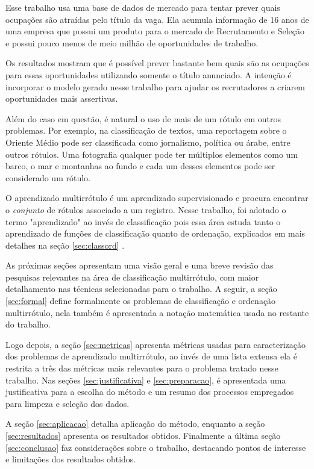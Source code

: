 \documentclass[runningheads,a4paper]{llncs}
\begin{document}
Esse trabalho usa uma base de dados de mercado para tentar prever quais ocupações são atraídas pelo título da vaga. Ela acumula informação de 16 anos de uma empresa que possui um produto para o mercado de Recrutamento e Seleção e possui pouco menos de meio milhão de oportunidades de trabalho.

Os resultados mostram que é possível prever bastante bem quais são as ocupações para essas oportunidades utilizando somente o título anunciado. A intenção é incorporar o modelo gerado nesse trabalho para ajudar os recrutadores a criarem oportunidades mais assertivas.

Além do caso em questão, é natural o uso de mais de um rótulo em outros problemas. Por exemplo, na classificação de textos, uma reportagem sobre o Oriente Médio pode ser classificada como jornalismo, política ou árabe, entre outros rótulos. Uma fotografia qualquer pode ter múltiplos elementos como um barco, o mar e montanhas ao fundo e cada um desses elementos pode ser considerado um rótulo.

O aprendizado multirrótulo é um aprendizado supervisionado e procura encontrar o \emph{conjunto} de rótulos associado a um registro. Nesse trabalho, foi adotado o termo "aprendizado" ao invés de classificação pois essa área estuda tanto o aprendizado de funções de classificação quanto de ordenação, explicados em mais detalhes na seção \ref{sec:classord} \cite{Zhang2014-be}.

As próximas seções apresentam uma visão geral e uma breve revisão das pesquisas relevantes na área de classificação multirrótulo, com maior detalhamento nas técnicas selecionadas para o trabalho. A seguir, a seção \ref{sec:formal} define formalmente os problemas de classificação e ordenação multirrótulo, nela também é apresentada a notação matemática usada no restante do trabalho. 

Logo depois, a seção \ref{sec:metricas} apresenta métricas usadas para caracterização dos problemas de aprendizado multirrótulo, ao invés de uma lista extensa ela é restrita a três das métricas mais relevantes para o problema tratado nesse trabalho. Nas seções \ref{sec:justificativa} e \ref{sec:preparacao}, é apresentada uma justificativa para a escolha do método e  um resumo dos processos empregados para limpeza e seleção dos dados.

A seção \ref{sec:aplicacao} detalha aplicação do método, enquanto a seção \ref{sec:resultados} apresenta os resultados obtidos. Finalmente a última seção \ref{sec:conclusao} faz considerações sobre o trabalho, destacando pontos de interesse e limitações dos resultados obtidos.
\end{document}
